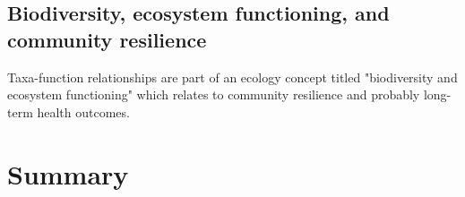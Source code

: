 \subsection{Biodiversity, ecosystem functioning, and community resilience}
Taxa-function relationships are part of an ecology concept titled "biodiversity and ecosystem functioning" which relates to community resilience and probably long-term health outcomes. 


\section{Summary}
